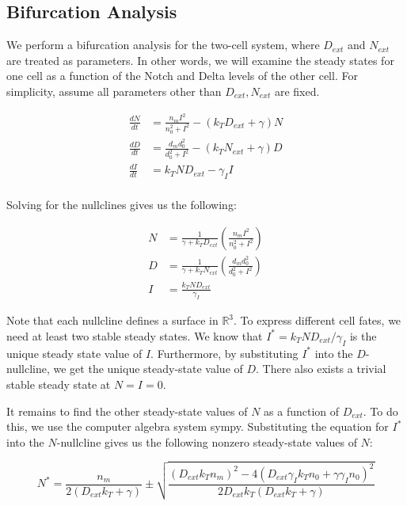 \documentclass{article}
\begin{document}
\begin{flushleft}
\subsection{Bifurcation Analysis}

We perform a bifurcation analysis for the two-cell system, where $D_{ext}$ and $N_{ext}$ are treated as parameters. In other words, we will examine the steady states for one cell as a function of the Notch and Delta levels of the other cell. For simplicity, assume all parameters other than $D_{ext}, N_{ext}$ are fixed.

$$
\begin{aligned}
  \frac{dN}{dt} &= \frac{n_{m}I^2}{n_{0}^2 + I^2} - (k_{T}D_{ext} + \gamma)N \\[5pt]
  \frac{dD}{dt} &= \frac{d_{m}d_{0}^2}{d_{0}^2 + I^2} - (k_{T}N_{ext} + \gamma)D \\[5pt]
  \frac{dI}{dt} &= k_{T}ND_{ext} - \gamma_{I}I \\[5pt]
\end{aligned}
$$

Solving for the nullclines gives us the following:

$$
\begin{aligned}
  N &= \frac{1}{\gamma + k_{T}D_{ext}}\left(\frac{n_{m}I^2}{n_{0}^2 + I^2}\right) \\[5pt]
  D &= \frac{1}{\gamma + k_{T}N_{ext}}\left( \frac{d_{m}d_{0}^2}{d_{0}^2 + I^2} \right) \\[5pt]
  I &= \frac{k_{T}ND_{ext}}{\gamma_{I}}
\end{aligned}
$$

Note that each nullcline defines a surface in $\mathbb{R}^3$. To express different cell fates, we need at least two stable steady states. We know that $I^{*} = k_{T}ND_{ext} / \gamma_{I}$ is the unique steady state value of $I$. Furthermore, by substituting $I^{*}$ into the $D$-nullcline, we get the unique steady-state value of $D$. There also exists a trivial stable steady state at $N = I = 0$. 

\medskip

It remains to find the other steady-state values of $N$ as a function of $D_{ext}$. To do this, we use the computer algebra system sympy. Substituting the equation for $I^{*}$ into the $N$-nullcline gives us the following nonzero steady-state values of $N$:

\medskip

$$
N^{*} = \frac{n_{m}}{2(D_{ext}k_{T} + \gamma)} \pm \sqrt{\frac{(D_{ext}k_{T}n_{m})^2 - 4(D_{ext}\gamma_{I}k_{T}n_{0} + \gamma \gamma_{I}n_{0})^2}{2D_{ext}k_{T}(D_{ext}k_{T} + \gamma)}}
$$


\end{flushleft}
\end{document}
